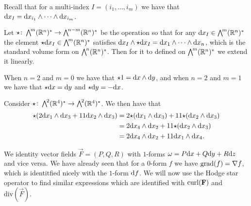 \documentclass[11pt,a4paper]{article}
\renewcommand{\div}{\mathrm{div}}
\begin{document}
\begin{remark}
  Recall that for a multi-index $I = (i_1,\dots,i_m)$
  we have that $\dx_I = \dx_{i_1} \wedge \cdots \wedge \dx_{i_m}$.
\end{remark}

\begin{definition}
  \label{def:hodge}
  Let ${\mathnormal{\star}} \colon \bigwedge^{\!m}(\mathbb{R}^n)^* \to \bigwedge^{\!n-m}(\mathbb{R}^n)^*$
  be the operation so that for any $\dx_I \in \bigwedge^{\!m}(\R^n)^*$
  the element $\hodge \dx_I \in \bigwedge^{\!m}(\R^n)^*$ satisfies
  $\dx_I \wedge \hodge \dx_I = \dx_1 \wedge \cdots \wedge \dx_n$,
  which is the standard volume form on $\bigwedge^{\!n}(\mathbb{R}^n)^*$.
  Then for it to defined on $\bigwedge^{\!m}(\mathbb{R}^n)^*$ we extend it linearly.
\end{definition}

\begin{example}
  When $n = 2$ and $m = 0$ we have that $\hodge 1 = \dx \wedge \dy$,
  and when $n = 2$ and $m = 1$ we have that
  $\hodge \dx = \dy$ and $\hodge \dy = -\dx$.
\end{example}

\begin{example}
  Consider ${\mathnormal{\star}} \colon \bigwedge^{\!2}(\mathbb{R}^4)^* \to \bigwedge^{\!2}(\mathbb{R}^4)^*$.
  We then have that
  \begin{align*}
    \hodge(2\dx_1 \wedge \dx_3 + 11 \dx_2 \wedge \dx_3) &=
    2\hodge(\dx_1 \wedge \dx_3) + 11 \hodge(\dx_2 \wedge \dx_3) \\ &=
    2 \dx_4 \wedge \dx_2 + 11 \hodge(\dx_2 \wedge \dx_3) \\ &=
    2 \dx_4 \wedge \dx_2 + 11 \dx_1 \wedge \dx_4.
  \end{align*}
\end{example}

\begin{remark}
  We identity vector fields $\vec F = (P,Q,R)$ with
  $1$-forms $\omega = P \dx + Q \dy + R \dz$ and vice versa.
  We have already seen that for a $0$-form
  $f$ we have $\operatorname{grad}(f) = \nabla f$,
  which is identitfied nicely with the $1$-form $\mathrm{d} f$.
  We will now use the Hodge star operator to find similar expressions
  which are identified with $\operatorname{curl}(\boldsymbol{\mathbf{F}})$ and $\div(\vec F)$.
\end{remark}
\end{document}

